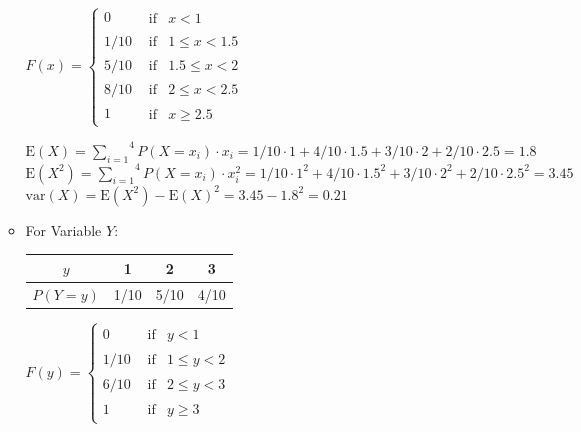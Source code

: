 \documentclass[12pt,thmsa]{article}
\begin{document}
\begin{enumerate}
\begin{itemize}
			\medskip
			\begin{center}
			$F(x)=\begin{cases}
			0 & \begin{array}{cc} \textrm{if} & x<1\end{array}\\
			1/10 & \begin{array}{cc} \textrm{if} & 1\leq x<1.5\end{array}\\
			5/10 & \begin{array}{cc} \textrm{if} & 1.5\leq x<2\end{array}\\
			8/10 & \begin{array}{cc} \textrm{if} & 2\leq x<2.5\end{array}\\
			1 & \begin{array}{cc} \textrm{if} & x\geq2.5\end{array}
			\end{cases}$
			\end{center}

\begin{center}
			$\mbox{E}(X) = \overset{4}{\underset{i=1}{\sum}}P(X=x_i)\cdot x_i = 1/10\cdot1 + 4/10\cdot1.5 + 				3/10\cdot2 + 2/10\cdot2.5 = 1.8$ \\
			$\mbox{E}(X^2) = \overset{4}{\underset{i=1}{\sum}}P(X=x_i)\cdot x_i^2 = 1/10\cdot1^2 + 						4/10\cdot1.5^2 + 3/10\cdot2^2 + 2/10\cdot2.5^2 = 3.45 $\\
			$\mbox{var}(X) =  \mbox{E}(X^2) - \mbox{E}(X)^2 = 3.45 - 1.8^2 = 0.21$
\end{center}

\item 		For Variable $Y$:
			\begin{center}
			\begin{tabular}{|c|c|c|c|}
			\hline
			$y$ & 1 & 2 & 3 \\
			\hline
			$P(Y=y)$ & 1/10 & 5/10 & 4/10\\
			\hline
			\end{tabular}
			\end{center}

			\medskip
			\begin{center}
			$F(y)=\begin{cases}
			0 & \begin{array}{cc} \textrm{if} & y<1\end{array}\\
			1/10 & \begin{array}{cc} \textrm{if} & 1\leq y<2\end{array}\\
			6/10 & \begin{array}{cc} \textrm{if} & 2\leq y<3\end{array}\\
			1 & \begin{array}{cc} \textrm{if} &  y\geq 3\end{array}
			\end{cases}$
			\end{center}


\end{itemize}
\end{enumerate}
\end{document}
